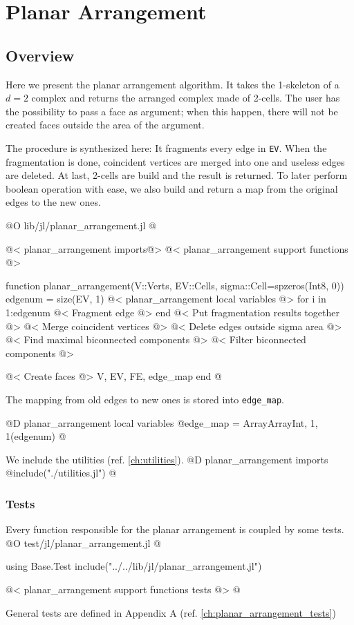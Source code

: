 \chapter{Planar Arrangement}
\label{ch:planar_arrangement}

\section{Overview}
\label{sec:planar_arrangement_overview}

Here we present the planar arrangement algorithm. It takes the 1-skeleton of a $d=2$ complex and returns 
the arranged complex made of 2-cells. The user has the possibility to pass a face as argument; when this happen,
there will not be created faces outside the area of the argument.

The procedure is synthesized here:
It fragments every edge in \texttt{EV}. 
When the fragmentation is done, coincident vertices are merged into one and useless edges are deleted. At last,
2-cells are build and the result is returned.
To later perform boolean operation with ease, we also build and return a map from the original
edges to the new ones.

@O lib/jl/planar_arrangement.jl
@{@< planar\_arrangement imports@>
@< planar\_arrangement support functions @>

function planar_arrangement(V::Verts, EV::Cells, sigma::Cell=spzeros(Int8, 0))
    edgenum = size(EV, 1)
    @< planar\_arrangement local variables @>
    for i in 1:edgenum
        @< Fragment edge @>
    end
    @< Put fragmentation results together @>
    @< Merge coincident vertices @>
    @< Delete edges outside sigma area @>
    @< Find maximal biconnected components @>
    @< Filter biconnected components @>

    @< Create faces @>
    V, EV, FE, edge_map
end 
@}

The mapping from old edges to new ones is stored into \texttt{edge\_map}.

@D planar\_arrangement local variables
@{edge_map = Array{Array{Int, 1}, 1}(edgenum)
@}

We include the utilities (ref. \ref{ch:utilities}).
@D planar\_arrangement imports
@{include("./utilities.jl")
@}
\subsection{Tests}
Every function responsible for the planar arrangement is coupled by some tests. 
@O test/jl/planar_arrangement.jl
@{using Base.Test
include("../../lib/jl/planar_arrangement.jl")

@< planar\_arrangement support functions tests @>
@}
General tests are defined in Appendix A (ref. \ref{ch:planar_arrangement_tests})










